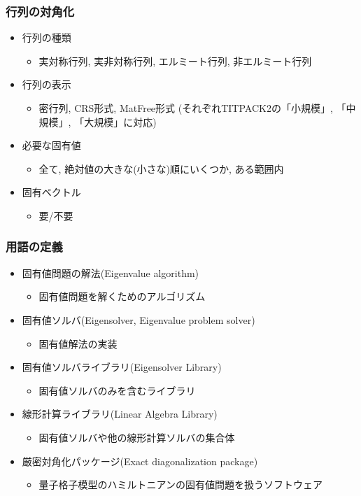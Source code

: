 \begin{frame}
  \frametitle{行列の対角化}
  \begin{itemize}
  \item 行列の種類
    \begin{itemize}
    \item 実対称行列, 実非対称行列, エルミート行列, 非エルミート行列
    \end{itemize}
  \item 行列の表示
    \begin{itemize}
      \item 密行列, CRS形式, MatFree形式 (それぞれTITPACK2の「小規模」, 
        「中規模」, 「大規模」に対応)
    \end{itemize}
  \item 必要な固有値
    \begin{itemize}
      \item 全て, 絶対値の大きな(小さな)順にいくつか, ある範囲内
    \end{itemize}
  \item 固有ベクトル
    \begin{itemize}
      \item 要/不要
    \end{itemize}
  \end{itemize}
\end{frame}

\begin{frame}
  \frametitle{用語の定義}
  \begin{itemize}
  \item 固有値問題の解法(Eigenvalue algorithm)
    \begin{itemize}
      \item 固有値問題を解くためのアルゴリズム
    \end{itemize}
  \item 固有値ソルバ(Eigensolver, Eigenvalue problem solver)
    \begin{itemize}
      \item 固有値解法の実装
    \end{itemize}
  \item 固有値ソルバライブラリ(Eigensolver Library)
    \begin{itemize}
      \item 固有値ソルバのみを含むライブラリ
    \end{itemize}
  \item 線形計算ライブラリ(Linear Algebra Library)
    \begin{itemize}
      \item 固有値ソルバや他の線形計算ソルバの集合体
    \end{itemize}
  \item 厳密対角化パッケージ(Exact diagonalization package)
    \begin{itemize}
      \item 量子格子模型のハミルトニアンの固有値問題を扱うソフトウェア
    \end{itemize}
  \end{itemize}
\end{frame}

